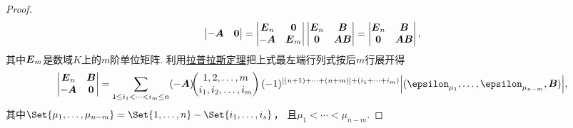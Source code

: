 \begin{theorem}
\begin{proof}
\begin{gather*}
\begin{vmatrix}
		-\boldsymbol{A} & \boldsymbol0
	\end{vmatrix}
	= \begin{vmatrix}
		\boldsymbol{E}_n & \boldsymbol0 \\
		-\boldsymbol{A} & \boldsymbol{E}_m
	\end{vmatrix} \begin{vmatrix}
		\boldsymbol{E}_n & \boldsymbol{B} \\
		\boldsymbol0 & \boldsymbol{A}\boldsymbol{B}
	\end{vmatrix}
	= \begin{vmatrix}
		\boldsymbol{E}_n & \boldsymbol{B} \\
		\boldsymbol0 & \boldsymbol{A}\boldsymbol{B}
	\end{vmatrix},
\end{gather*}
其中\(\boldsymbol{E}_m\)是数域\(K\)上的\(m\)阶单位矩阵.
利用\hyperref[theorem:行列式.拉普拉斯定理]{拉普拉斯定理}把上式最左端行列式按后\(m\)行展开得\begin{equation*}
	\begin{vmatrix}
		\vb{E}_n & \vb{B} \\
		-\vb{A} & \vb0
	\end{vmatrix}
	= \sum_{1 \leq i_1 < \dotsb < i_m \leq n}
	\MatrixMinor{(-\vb{A})}{
		1,2,\dotsc,m \\
		i_1,i_2,\dotsc,i_m
	}
	(-1)^{[(n+1)+\dotsb+(n+m)]+(i_1+\dotsb+i_m)}
	\abs{(\vb\epsilon_{\mu_1},\dotsc,\vb\epsilon_{\mu_{n-m}},\vb{B})},
\end{equation*}
其中\(\Set{\mu_1,\dotsc,\mu_{n-m}}
= \Set{1,\dotsc,n}-\Set{i_1,\dotsc,i_s}\)，
且\(\mu_1<\dotsb<\mu_{n-m}\).


\end{proof}
\end{theorem}
